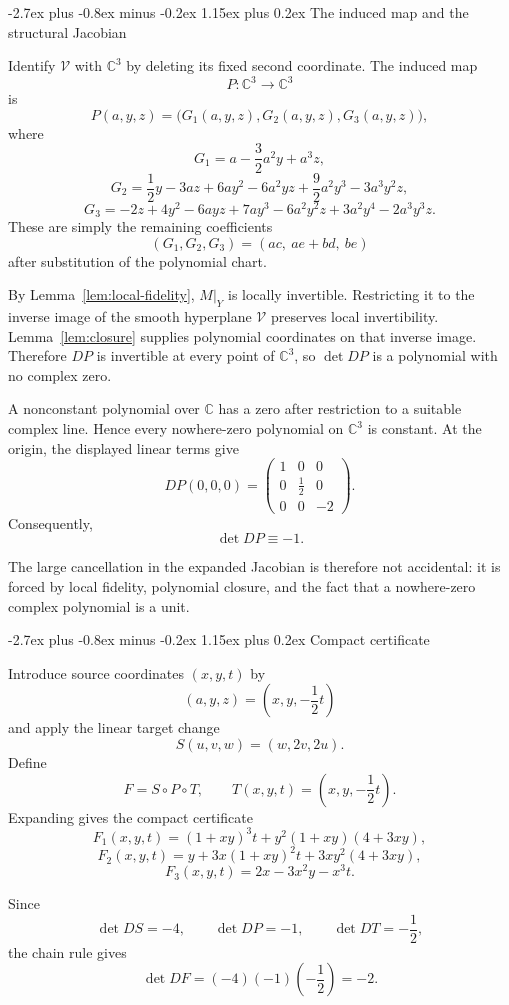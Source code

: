 \documentclass[11pt,letterpaper]{article}
\makeatletter
\newcommand{\C}{\mathbb{C}}
\theoremstyle{jgpplain}
\renewcommand{\section}{\@startsection{section}{1}{0pt}%
  {-2.7ex plus -0.8ex minus -0.2ex}%
  {1.15ex plus 0.2ex}%
  {\normalfont\sffamily\Large\bfseries\color{JGPBlue}}}
\makeatother
\begin{document}
\section{The induced map and the structural Jacobian}

Identify \(\mathcal V\) with \(\C^3\) by deleting its fixed second coordinate.
The induced map
\[
P:\C^3\longrightarrow\C^3
\]
is
\[
P(a,y,z)=\bigl(G_1(a,y,z),G_2(a,y,z),G_3(a,y,z)\bigr),
\]
where
\[
G_1=a-\frac32a^2y+a^3z,
\]
\[
G_2=\frac12y-3az+6ay^2-6a^2yz
     +\frac92a^2y^3-3a^3y^2z,
\]
\[
G_3=-2z+4y^2-6ayz+7ay^3-6a^2y^2z
     +3a^2y^4-2a^3y^3z.
\]
These are simply the remaining coefficients
\[
(G_1,G_2,G_3)=(ac,\ ae+bd,\ be)
\]
after substitution of the polynomial chart.

By Lemma~\ref{lem:local-fidelity}, \(M|_Y\) is locally invertible. Restricting
it to the inverse image of the smooth hyperplane \(\mathcal V\) preserves local
invertibility. Lemma~\ref{lem:closure} supplies polynomial coordinates on that
inverse image. Therefore \(DP\) is invertible at every point of \(\C^3\), so
\(\det DP\) is a polynomial with no complex zero.

A nonconstant polynomial over \(\C\) has a zero after restriction to a suitable
complex line. Hence every nowhere-zero polynomial on \(\C^3\) is constant. At
the origin, the displayed linear terms give
\[
DP(0,0,0)
=
\begin{pmatrix}
1&0&0\\
0&\frac12&0\\
0&0&-2
\end{pmatrix}.
\]
Consequently,
\[
\det DP\equiv -1.
\]

The large cancellation in the expanded Jacobian is therefore not accidental:
it is forced by local fidelity, polynomial closure, and the fact that a
nowhere-zero complex polynomial is a unit.

\section{Compact certificate}

Introduce source coordinates \((x,y,t)\) by
\[
(a,y,z)=\left(x,y,-\frac12t\right)
\]
and apply the linear target change
\[
S(u,v,w)=(w,2v,2u).
\]
Define
\[
F=S\circ P\circ T,
\qquad
T(x,y,t)=\left(x,y,-\frac12t\right).
\]
Expanding gives the compact certificate
\[
F_1(x,y,t)
=(1+xy)^3t+y^2(1+xy)(4+3xy),
\]
\[
F_2(x,y,t)
=y+3x(1+xy)^2t+3xy^2(4+3xy),
\]
\[
F_3(x,y,t)
=2x-3x^2y-x^3t.
\]

Since
\[
\det DS=-4,
\qquad
\det DP=-1,
\qquad
\det DT=-\frac12,
\]
the chain rule gives
\[
\det DF=(-4)(-1)\left(-\frac12\right)=-2.
\]
\end{document}
